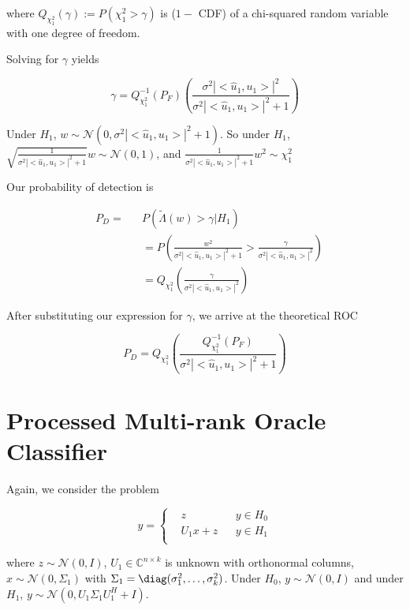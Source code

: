 \documentclass[english]{article}
\begin{document}
where $Q_{\chi^2_1}(\gamma):=P(\chi^2_1 > \gamma)$ is ($1-$ CDF) of a chi-squared random variable with one degree of freedom.

Solving for $\gamma$ yields

\begin{equation}
\gamma = Q^{-1}_{\chi^2_1}(P_F)\left(\frac{\sigma^2|<\hat{u}_1,u_1>|^2}{\sigma^2|<\hat{u}_1,u_1>|^2+1}\right)
\end{equation}

Under $H_1$, $w\sim\mathcal{N}(0, \sigma^2|<\hat{u}_1,u_1>|^2+1)$. So under $H_1$, $\sqrt{\frac{1}{\sigma^2|<\hat{u}_1,u_1>|^2+1}}w\sim\mathcal{N}(0,1)$, and $\frac{1}{\sigma^2|<\hat{u}_1,u_1>|^2+1}w^2\sim\chi^2_1$

Our probability of detection is

\begin{equation}
\begin{aligned}
&P_D=
&&P(\tilde{\Lambda}(w) >\gamma|H_1)\\
&&&=P\left(\frac{w^2}{\sigma^2|<\hat{u}_1,u_1>|^2+1}>\frac{\gamma}{\sigma^2|<\hat{u}_1,u_1>|^2}\right)\\
&&&=Q_{\chi^2_1}\left(\frac{\gamma}{\sigma^2|<\hat{u}_1,u_1>|^2}\right)
\end{aligned}
\end{equation}

After substituting our expression for $\gamma$, we arrive at the theoretical ROC

\begin{equation}
\boxed{P_D=Q_{\chi^2_1}\left(\frac{Q^{-1}_{\chi^2_1}(P_F)}{\sigma^2|<\hat{u}_1,u_1>|^2+1}\right)}
\end{equation}

\section*{Processed Multi-rank Oracle Classifier}

Again, we consider the problem

\begin{equation}\label{eq:prob state}
y=\left\{
\begin{aligned}
&z
&& y\in H_0\\
&U_1x+z
&& y\in H_1\\
\end{aligned}\right.
\end{equation}

where $z\sim\mathcal{N}(0,I)$, $U_1\in\mathbb{C}^{n\times k}$ is unknown with orthonormal columns, $x\sim\mathcal{N}(0,\Sigma_1)$ with $\Sigma_1=\diag(\sigma_1^2,\dots,\sigma_k^2)$. Under $H_0$, $y\sim\mathcal{N}(0,I)$ and under $H_1$, $y\sim\mathcal{N}(0,U_1\Sigma_1U_1^H+I)$.
\end{document}
